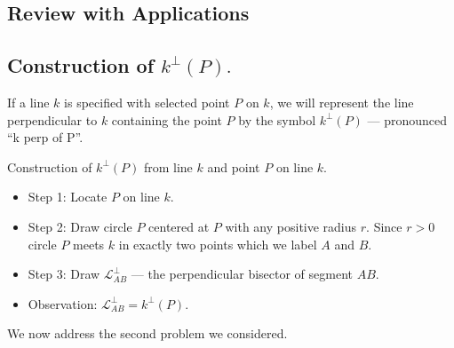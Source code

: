 \documentclass{tufte-handout}
\newcommand{\uvx}{\vspace{.2in}}
\begin{document}
\begin{tcolorbox}[enhanced jigsaw,breakable,pad at break*=1mm,
  colback=cyan!2!white,colframe=blue!75!black,title=Student View: Slide 4,drop fuzzy shadow,watermark color=white,watermark text=\arabic{tcbbreakpart}]
  \section{Review with Applications}\subsection{Construction of $k^{\perp}(P).$}
   If a line $k$ is specified with selected point $P$ on $k$, we will represent the line perpendicular to $k$ containing the point $P$ by the symbol $k^{\perp}(P)$ --- pronounced ``k perp of P''. 
  
   Construction of $k^{\perp}(P)$ from line $k$ and point $P$ on line $k.$
  \begin{itemize}
      \item Step 1: Locate $P$ on line $k$.
      \item Step 2: Draw circle $P$ centered at $P$ with any positive radius $r.$ Since $r>0$ circle $P$ meets $k$ in exactly two points which we label $A$ and $B.$
      \item Step 3: Draw $\mathcal{L}_{AB}^{\perp}$ --- the perpendicular bisector of segment $AB.$ 
      \item Observation: $\mathcal{L}_{AB}^{\perp}= k^{\perp}(P)$.
  \end{itemize}
  
  \uvx We now address the second problem we considered.
  
 
\end{tcolorbox}
\end{document}
